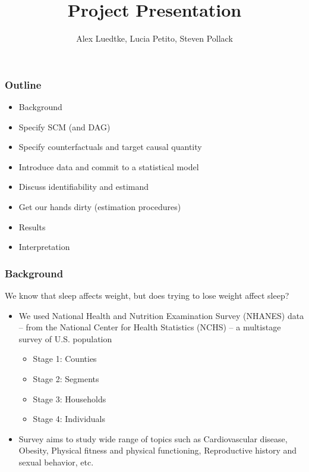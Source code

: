 \documentclass{beamer}
\title[ On the affect of ``attempting to lose weight'' on sleep ]{Project Presentation}
\author{Alex Luedtke, Lucia Petito, Steven Pollack}
\institute{PHC252D}
\date{}
\begin{document}
\maketitle 
\begin{frame}
 \frametitle{Outline} %
  \begin{itemize}
    \item Background
    \item Specify SCM (and DAG)
    \item Specify counterfactuals and target causal quantity
    \item Introduce data and commit to a statistical model
    \item Discuss identifiability and estimand
    \item Get our hands dirty (estimation procedures)
    \item Results
    \item Interpretation
  \end{itemize}
\end{frame}

\begin{frame}
 \frametitle{Background}
 We know that sleep affects weight, but does trying to lose weight affect sleep?
 \begin{itemize}
  \item We used National Health and Nutrition Examination Survey (NHANES) data -- from the National Center for Health Statistics (NCHS) -- a multistage survey of U.S. population
    \begin{itemize}
      \item Stage 1: Counties
      \item Stage 2: Segments
      \item Stage 3: Households
      \item Stage 4: Individuals
    \end{itemize}
  \item Survey aims to study wide range of topics such as Cardiovascular disease, Obesity, Physical fitness and physical functioning, Reproductive history and sexual behavior, etc.
  \end{itemize}
\end{frame}
\end{document}
